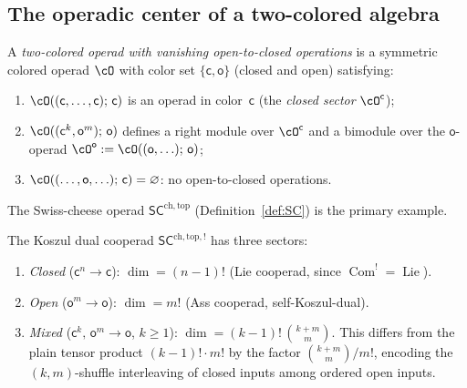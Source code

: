 \subsection{The operadic center of a two-colored algebra}
\label{subsec:operadic-center-definition}

\begin{definition}
\label{def:two-colored-operad-vanishing}
A \emph{two-colored operad with vanishing open-to-closed operations}
is a symmetric colored operad $\cO$ with color set
$\{\mathsf{c}, \mathsf{o}\}$ (closed and open) satisfying:
\begin{enumerate}[label=\textup{(\roman*)}]
\item $\cO((\mathsf{c},\ldots,\mathsf{c});\,\mathsf{c})$ is an
 operad in color~$\mathsf{c}$ (the \emph{closed sector}
 $\cO^{\mathsf{c}}$);
\item $\cO((\mathsf{c}^k, \mathsf{o}^m);\, \mathsf{o})$ defines a
 right module over $\cO^{\mathsf{c}}$ and a bimodule over the
 $\mathsf{o}$-operad
 $\cO^{\mathsf{o}} := \cO((\mathsf{o},\ldots);\, \mathsf{o})$;
\item $\cO((\ldots,\mathsf{o},\ldots);\,\mathsf{c}) = \varnothing$:
 no open-to-closed operations.
\end{enumerate}
The Swiss-cheese operad $\mathsf{SC}^{\mathrm{ch,top}}$
(Definition~\ref{def:SC}) is the primary example.
\end{definition}

\begin{proposition}
\label{prop:sc-koszul-dual-three-sectors}
The Koszul dual cooperad
$\mathsf{SC}^{\mathrm{ch,top},!}$ has three sectors:
\begin{enumerate}[label=\textup{(\roman*)}]
\item \emph{Closed} ($\mathsf{c}^n \to \mathsf{c}$):
 $\dim = (n{-}1)!$ \textup{(}Lie cooperad,
 since $\operatorname{Com}^! = \operatorname{Lie}$\textup{)}.
\item \emph{Open} ($\mathsf{o}^m \to \mathsf{o}$):
 $\dim = m!$ \textup{(}Ass cooperad,
 self-Koszul-dual\textup{)}.
\item \emph{Mixed} ($\mathsf{c}^k,\,\mathsf{o}^m \to \mathsf{o}$,
 $k \geq 1$):
 $\dim = (k{-}1)!\,\binom{k+m}{m}$.
 This differs from the plain tensor product
 $(k{-}1)!\cdot m!$ by the factor $\binom{k+m}{m}/m!$,
 encoding the $(k,m)$-shuffle interleaving of closed
 inputs among ordered open inputs.
\end{enumerate}
\end{proposition}

